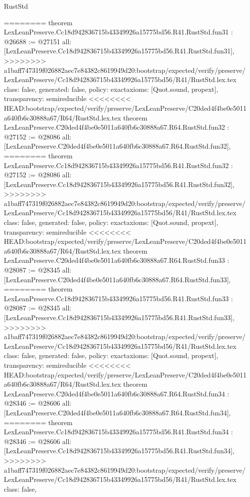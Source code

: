 \begin{lexlean}{RustStd}
\begin{coremodule}
{\begin{coremodule}
{{{{{{{{{{{{{{{{{{{{{{{{{{{{{{{{{{========
theorem LexLeanPreserve.Cc18d942836715b43349926a15775bd56.R41.RustStd.fun31 : @26688 := @27151 {
  all: [LexLeanPreserve.Cc18d942836715b43349926a15775bd56.R41.RustStd.fun31],
>>>>>>>> a1baff747319f026882aec7e84382c8619949d20:bootstrap/expected/verify/preserve/LexLeanPreserve/Cc18d942836715b43349926a15775bd56/R41/RustStd.lex.tex
  class: false,
  generated: false,
  policy: exact{axioms: [Quot.sound, propext]},
  transparency: semireducible
}
<<<<<<<< HEAD:bootstrap/expected/verify/preserve/LexLeanPreserve/C20ded4f4be0e5011a640fb6c30888a67/R64/RustStd.lex.tex
theorem LexLeanPreserve.C20ded4f4be0e5011a640fb6c30888a67.R64.RustStd.fun32 : @27152 := @28086 {
  all: [LexLeanPreserve.C20ded4f4be0e5011a640fb6c30888a67.R64.RustStd.fun32],
========
theorem LexLeanPreserve.Cc18d942836715b43349926a15775bd56.R41.RustStd.fun32 : @27152 := @28086 {
  all: [LexLeanPreserve.Cc18d942836715b43349926a15775bd56.R41.RustStd.fun32],
>>>>>>>> a1baff747319f026882aec7e84382c8619949d20:bootstrap/expected/verify/preserve/LexLeanPreserve/Cc18d942836715b43349926a15775bd56/R41/RustStd.lex.tex
  class: false,
  generated: false,
  policy: exact{axioms: [Quot.sound, propext]},
  transparency: semireducible
}
<<<<<<<< HEAD:bootstrap/expected/verify/preserve/LexLeanPreserve/C20ded4f4be0e5011a640fb6c30888a67/R64/RustStd.lex.tex
theorem LexLeanPreserve.C20ded4f4be0e5011a640fb6c30888a67.R64.RustStd.fun33 : @28087 := @28345 {
  all: [LexLeanPreserve.C20ded4f4be0e5011a640fb6c30888a67.R64.RustStd.fun33],
========
theorem LexLeanPreserve.Cc18d942836715b43349926a15775bd56.R41.RustStd.fun33 : @28087 := @28345 {
  all: [LexLeanPreserve.Cc18d942836715b43349926a15775bd56.R41.RustStd.fun33],
>>>>>>>> a1baff747319f026882aec7e84382c8619949d20:bootstrap/expected/verify/preserve/LexLeanPreserve/Cc18d942836715b43349926a15775bd56/R41/RustStd.lex.tex
  class: false,
  generated: false,
  policy: exact{axioms: [Quot.sound, propext]},
  transparency: semireducible
}
<<<<<<<< HEAD:bootstrap/expected/verify/preserve/LexLeanPreserve/C20ded4f4be0e5011a640fb6c30888a67/R64/RustStd.lex.tex
theorem LexLeanPreserve.C20ded4f4be0e5011a640fb6c30888a67.R64.RustStd.fun34 : @28346 := @28606 {
  all: [LexLeanPreserve.C20ded4f4be0e5011a640fb6c30888a67.R64.RustStd.fun34],
========
theorem LexLeanPreserve.Cc18d942836715b43349926a15775bd56.R41.RustStd.fun34 : @28346 := @28606 {
  all: [LexLeanPreserve.Cc18d942836715b43349926a15775bd56.R41.RustStd.fun34],
>>>>>>>> a1baff747319f026882aec7e84382c8619949d20:bootstrap/expected/verify/preserve/LexLeanPreserve/Cc18d942836715b43349926a15775bd56/R41/RustStd.lex.tex
  class: false,
}}}}}}}}}}}}}}}}}}}}}}}}}}}}}}}}}}}}}}
\end{coremodule}}
\end{coremodule}
\end{lexlean}
